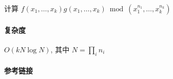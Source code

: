 计算 \(f(x_1,\dots,x_k)g(x_1,\dots,x_k)\bmod{\left(x_1^{n_1},\dots,x_k^{n_k}\right)}\)

\paragraph{复杂度} \(O(kN\log N)\), 其中 \(N=\prod_i n_i\)

\paragraph{参考链接} 